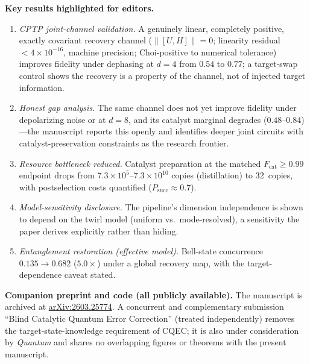 \documentclass[11pt,a4paper]{article}
\begin{document}
\textbf{Key results highlighted for editors.}
\begin{enumerate}
\item \emph{CPTP joint-channel validation.} A genuinely linear, completely positive, exactly covariant recovery channel ($\|[U,H]\| = 0$; linearity residual $< 4 \times 10^{-16}$, machine precision; Choi-positive to numerical tolerance) improves fidelity under dephasing at $d = 4$ from $0.54$ to $0.77$; a target-swap control shows the recovery is a property of the channel, not of injected target information.
\item \emph{Honest gap analysis.} The same channel does not yet improve fidelity under depolarizing noise or at $d = 8$, and its catalyst marginal degrades ($0.48$--$0.84$)---the manuscript reports this openly and identifies deeper joint circuits with catalyst-preservation constraints as the research frontier.
\item \emph{Resource bottleneck reduced.} Catalyst preparation at the matched $F_\mathrm{cat} \geq 0.99$ endpoint drops from $7.3 \times 10^{5}$--$7.3 \times 10^{10}$ copies (distillation) to 32~copies, with postselection costs quantified ($P_\mathrm{succ} \approx 0.7$).
\item \emph{Model-sensitivity disclosure.} The pipeline's dimension independence is shown to depend on the twirl model (uniform vs.\ mode-resolved), a sensitivity the paper derives explicitly rather than hiding.
\item \emph{Entanglement restoration (effective model).} Bell-state concurrence $0.135 \to 0.682$ ($5.0\times$) under a global recovery map, with the target-dependence caveat stated.
\end{enumerate}

\medskip

\textbf{Companion preprint and code (all publicly available).}
The manuscript is archived at \href{https://doi.org/10.48550/arXiv.2603.25774}{arXiv:2603.25774}.
A concurrent and complementary submission ``Blind Catalytic Quantum Error Correction'' (treated independently) removes the target-state-knowledge requirement of CQEC; it is also under consideration by \emph{Quantum} and shares no overlapping figures or theorems with the present manuscript.

\medskip
\end{document}
